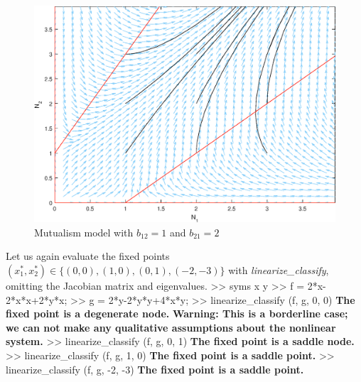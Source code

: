 \documentclass[11pt,a4paper]{scrartcl}
\theoremstyle{definition}
\begin{document}
\begin{figure}[!ht]
\centering
\includegraphics[scale=.72]{fig3.eps}
\caption{Mutualism model with $b_{12} = 1$ and $b_{21} = 2$}
\label{figM2}
\end{figure}

Let us again evaluate the fixed points $(x_1^{*}, x_2^{*}) \in \Big\{(0,0), (1,0), (0,1), (-2,-3) \Big\}$ with \newline\textit{linearize\_classify}, omitting the Jacobian matrix and eigenvalues.
\newline
>> syms x y\newline
>> f = 2*x-2*x*x+2*y*x;\newline
>> g = 2*y-2*y*y+4*x*y;\newline
>> linearize\_classify (f, g, 0, 0)\newline
\textbf{The fixed point is a degenerate node.}\newline
\textbf{Warning: This is a borderline case; we can not make any qualitative assumptions about the nonlinear system.}\newline
>> linearize\_classify (f, g, 0, 1)\newline
\textbf{The fixed point is a saddle node.}\newline
>> linearize\_classify (f, g, 1, 0)\newline
\textbf{The fixed point is a saddle point.}\newline
>> linearize\_classify (f, g, -2, -3)\newline
\textbf{The fixed point is a saddle point.}\newline
\end{document}
